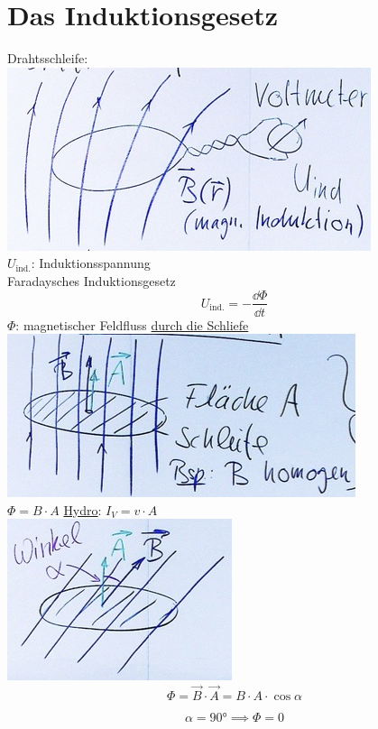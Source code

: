 \section{Das Induktionsgesetz}
Drahtsschleife: \\
\includegraphics{Bild207} \\
$U_{\text{ind.}}$: Induktionsspannung \\
Faradaysches Induktionsgesetz
\[ \boxed{ U_{\text{ind.}} = - \frac{\dd \Phi}{\dd t} } \]
$\Phi$: magnetischer Feldfluss \uline{durch die Schliefe} \\
\includegraphics{Bild208} \\
$\Phi = B \cdot A$
\uline{Hydro}: $I_V = v \cdot A$ \\
\includegraphics{Bild209} \\
\[ \Phi = \vec{B} \cdot \vec{A} = B \cdot A \cdot \cos \alpha \]
\begin{bsp*}[ head = z.B. ]
	\[ \alpha = \ang{90} \implies \Phi = 0 \]
\end{bsp*}

